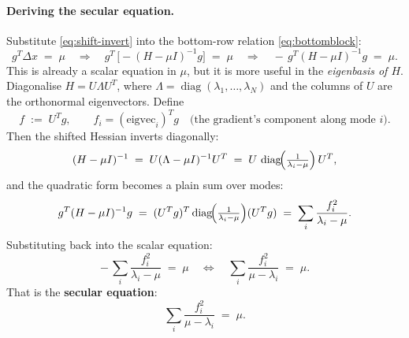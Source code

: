 \documentclass[11pt]{article}
\newcommand{\dx}{\Delta x}
\begin{document}
\paragraph{Deriving the secular equation.}
Substitute \eqref{eq:shift-invert} into the bottom-row relation
\eqref{eq:bottomblock}:
\begin{equation*}
  g^T \dx \;=\; \mu
  \quad\Longrightarrow\quad
  g^T \, \bigl[-(H - \mu I)^{-1} g\bigr] \;=\; \mu
  \quad\Longrightarrow\quad
  -\, g^T (H - \mu I)^{-1} g \;=\; \mu.
\end{equation*}
This is already a scalar equation in $\mu$, but it is more useful in the
\emph{eigenbasis of $H$}.  Diagonalise $H = U \Lambda U^T$, where
$\Lambda = \operatorname{diag}(\lambda_1, \dots, \lambda_N)$ and the columns
of $U$ are the orthonormal eigenvectors.  Define
\begin{equation*}
  f \;:=\; U^T g, \qquad
  f_i = (\text{eigvec}_i)^T g
  \quad\text{(the gradient's component along mode $i$)}.
\end{equation*}
Then the shifted Hessian inverts diagonally:
\begin{equation*}
  (H - \mu I)^{-1}
  \;=\; U (\Lambda - \mu I)^{-1} U^T
  \;=\; U \,\operatorname{diag}\!\Bigl(\tfrac{1}{\lambda_i - \mu}\Bigr)\, U^T,
\end{equation*}
and the quadratic form becomes a plain sum over modes:
\begin{equation*}
  g^T (H - \mu I)^{-1} g
  \;=\; (U^T g)^T \operatorname{diag}\!\Bigl(\tfrac{1}{\lambda_i - \mu}\Bigr) (U^T g)
  \;=\; \sum_i \frac{f_i^2}{\lambda_i - \mu}.
\end{equation*}
Substituting back into the scalar equation:
\begin{equation*}
  -\,\sum_i \frac{f_i^2}{\lambda_i - \mu} \;=\; \mu
  \quad\Longleftrightarrow\quad
  \sum_i \frac{f_i^2}{\mu - \lambda_i} \;=\; \mu.
\end{equation*}
That is the \textbf{secular equation}:
\begin{equation}\label{eq:secular}
  \boxed{\;\sum_i \frac{f_i^2}{\mu - \lambda_i} \;=\; \mu.\;}
\end{equation}
\end{document}
